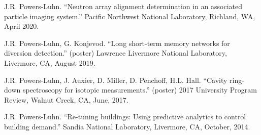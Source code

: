 \begin{bibsection}
\item J.R. Powers-Luhn. ``Neutron array alignment determination in an associated particle imaging system.'' Pacific Northwest National Laboratory, Richland, WA, April 2020.
\item J.R. Powers-Luhn, G. Konjevod. ``Long short-term memory networks for diversion detection.'' (poster) Lawrence Livermore National Laboratory, Livermore, CA, August 2019.
\item J.R. Powers-Luhn, J. Auxier, D. Miller, D. Penchoff, H.L. Hall. ``Cavity ring-down spectroscopy for isotopic measurements.'' (poster) 2017 University Program Review, Walnut Creek, CA, June, 2017.
\item J.R. Powers-Luhn. ``Re-tuning buildings: Using predictive analytics to control building demand.'' Sandia National Laboratory, Livermore, CA, October, 2014.

\end{bibsection}


